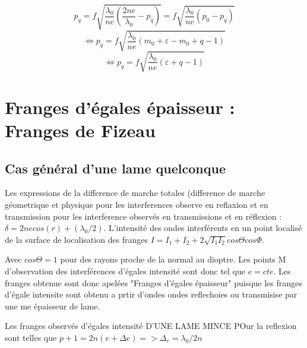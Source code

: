 \documentclass[a4paper,12pt]{article}
\theoremstyle{StyleTheo_will}
\theoremstyle{remark}
\begin{document}
\[p_q = f\sqrt{\frac{\lambda_0}{ne}\left(\frac{2ne}{\lambda_0} - p_q\right)} = f\sqrt{\frac{\lambda_0}{ne}\left(p_0 - p_q\right)}\]
\[ \Leftrightarrow p_q = f\sqrt{\frac{\lambda_0}{ne}\left(m_0 + \varepsilon -m_0 +q -1\right)}\]
\[ \Leftrightarrow p_q = f\sqrt{\frac{\lambda_0}{ne}\left(\varepsilon +q -1\right)}\]

\begin{center}
\end{center}
\section{Franges d'égales épaisseur : Franges de Fizeau}
\subsection{Cas général d'une lame quelconque}

Les expressions de la difference de marche totales (difference de marche géometrique et physique pour les interferences observe en reflaxion et en transmission pour les interference observés en transmissions et en réflexion :
$
\delta = 2ne cos(r) +(\lambda_0/2)
$.
L'intensité des ondes interférents en un point localisé de la surface de localisation des franges $ I = I_1 +I_2+2\sqrt{I_1I_2}cos\Theta  cos \Phi$.

Avec $cos\Theta = 1$ pour des rayons proche de la normal au dioptre. Les points M d'observation des interférences d'égales intensité sont donc tel que $e=cte$. Les franges obtenue sont donc apelées "Franges d'égales épaisseur" puisque les franges d'égale intensite sont obtenu a prtir d'ondes ondes reflechoies ou transmisise par une me épaisseur de lame. 

Les franges observés d'égales intensité D'UNE LAME MINCE POur la reflexion sont telles que $p+1 = 2n(e+\Delta e) => \Delta_e=\lambda_0/2n$
\end{document}
